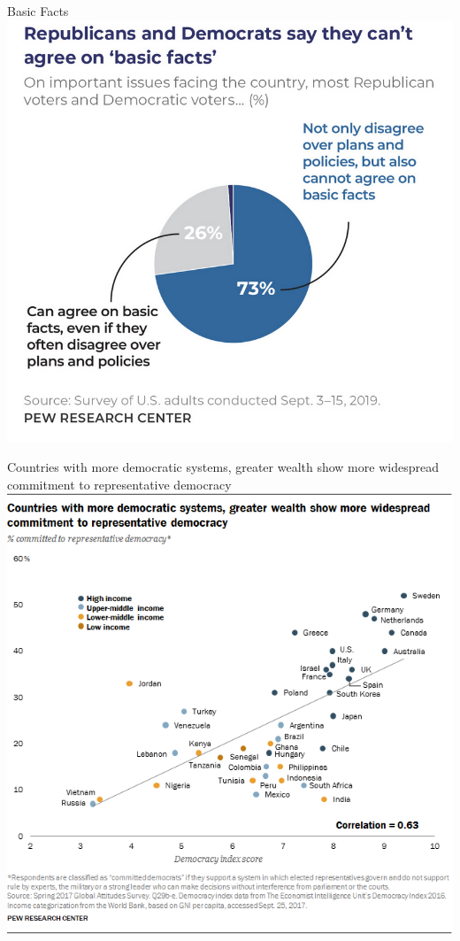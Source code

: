 \documentclass[
  ignorenonframetext,
  aspectratio=169]{beamer}
\begin{document}
\begin{frame}{Basic Facts}
\protect\hypertarget{basic-facts}{}
\includegraphics{img/facts-agree.png}
\end{frame}

\begin{frame}{Countries with more democratic systems, greater wealth
show more widespread commitment to representative democracy}
\protect\hypertarget{countries-with-more-democratic-systems-greater-wealth-show-more-widespread-commitment-to-representative-democracy}{}
\includegraphics{img/demo-wealth.png}
\end{frame}
\end{document}
